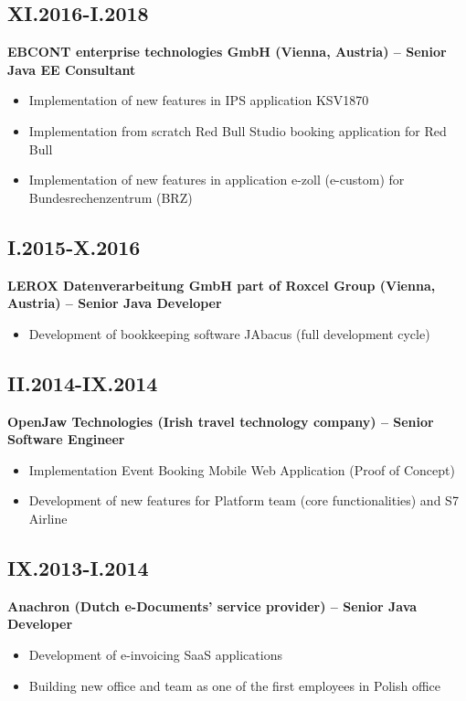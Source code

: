 \documentclass[11pt,a4paper]{article}
\begin{document}
\subsection*{XI.2016-I.2018}
\textbf{EBCONT enterprise technologies GmbH (Vienna, Austria) -- Senior Java EE Consultant}
\begin{itemize}
    \item Implementation of new features in IPS application KSV1870
    \item Implementation from scratch Red Bull Studio booking application for Red Bull
    \item Implementation of new features in application e-zoll (e-custom) for Bundesrechenzentrum (BRZ)
\end{itemize}

\subsection*{I.2015-X.2016}
\textbf{LEROX Datenverarbeitung GmbH part of Roxcel Group (Vienna, Austria) -- Senior Java Developer}
\begin{itemize}
    \item Development of bookkeeping software JAbacus (full development cycle)
\end{itemize}

\subsection*{II.2014-IX.2014}
\textbf{OpenJaw Technologies (Irish travel technology company) -- Senior Software Engineer}
\begin{itemize}
    \item Implementation Event Booking Mobile Web Application (Proof of Concept)
    \item Development of new features for Platform team (core functionalities) and S7 Airline
\end{itemize}

\subsection*{IX.2013-I.2014}
\textbf{Anachron (Dutch e-Documents' service provider) -- Senior Java Developer}
\begin{itemize}
    \item Development of e-invoicing SaaS applications
    \item Building new office and team as one of the first employees in Polish office
\end{itemize}
\end{document}
